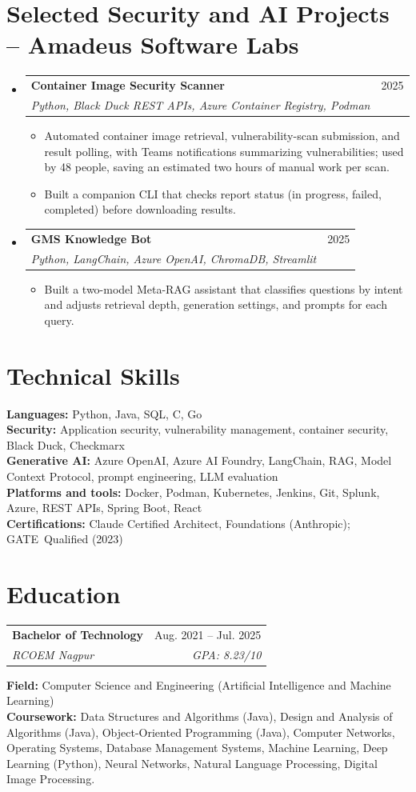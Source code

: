 \documentclass[a4paper,11pt]{article}
\makeatletter
\newcommand{\entry}[4]{\item\begin{tabularx}{\textwidth}{@{}Xr@{}}\textbf{#1}& #2\\\textit{\small #3}&\textit{\small #4}\end{tabularx}\vspace{-5pt}}
\newcommand{\bulletpoint}[1]{\item\small{#1}}
\makeatother
\begin{document}
\section{Selected Security and AI Projects -- Amadeus Software Labs}
\begin{itemize}[leftmargin=0in,label={}]
  \entry{Container Image Security Scanner}{2025}{Python, Black Duck REST APIs, Azure Container Registry, Podman}{}
  \begin{itemize}
    \bulletpoint{Automated container image retrieval, vulnerability-scan submission, and result polling, with Teams \mbox{notif{}ications} summarizing vulnerabilities; used by 48 people, saving an estimated two hours of manual work per scan.}
    \bulletpoint{Built a companion CLI that checks report status (in progress, failed, completed) before downloading results.}
  \end{itemize}
  \entry{GMS Knowledge Bot}{2025}{Python, LangChain, Azure OpenAI, ChromaDB, Streamlit}{}
  \begin{itemize}
    \bulletpoint{Built a two-model Meta-RAG assistant that classif{}ies questions by intent and adjusts retrieval depth, generation settings, and prompts for each query.}
  \end{itemize}
\end{itemize}

\section{Technical Skills}
\small\textbf{Languages:} Python, Java, SQL, C, Go \\
\textbf{Security:} Application security, vulnerability management, container security, Black Duck, Checkmarx \\
\textbf{Generative AI:} Azure OpenAI, Azure AI Foundry, LangChain, RAG, Model Context Protocol, prompt engineering, LLM evaluation \\
\textbf{Platforms and tools:} Docker, Podman, Kubernetes, Jenkins, Git, Splunk, Azure, REST APIs, Spring Boot, React \\
\textbf{Certif{}ications:} Claude \mbox{Certif{}ied} Architect, Foundations (Anthropic); \mbox{GATE Qualif{}ied} (2023)

\section{Education}
\begin{tabularx}{\textwidth}{@{}Xr@{}}
  \textbf{Bachelor of Technology} & Aug. 2021 -- Jul. 2025 \\
  \textit{\small RCOEM Nagpur} & \textit{\small GPA: 8.23/10} \\
\end{tabularx}
\small\textbf{Field:} Computer Science and Engineering (Artif{}icial Intelligence and Machine Learning)\\
\small\textbf{Coursework:} Data Structures and Algorithms (Java), Design and Analysis of Algorithms (Java), Object-Oriented Programming (Java), Computer Networks, Operating Systems, Database Management Systems, Machine Learning, Deep Learning (Python), Neural Networks, Natural Language Processing, Digital Image Processing.
\end{document}
